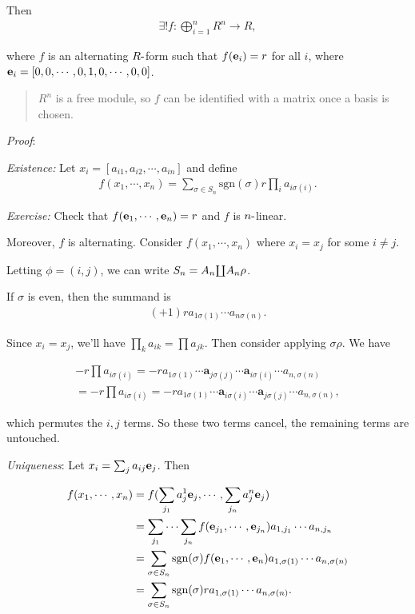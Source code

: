 Then
\begin{align*}
\exists! f: \bigoplus_{i=1}^n R^n \to R
,\end{align*}

where \(f\) is an alternating \(R{\hbox{-}}\)form such that
\(f(\mathbf{e}_i) = r\) for all \(i\), where
\(\mathbf{e}_i = [0, 0, \cdots, 0, 1, 0, \cdots, 0, 0]\).

\begin{quote}
\(R^n\) is a free module, so \(f\) can be identified with a matrix once
a basis is chosen.
\end{quote}

\emph{Proof}:

\emph{Existence:} Let \(x_i = [a_{i1}, a_{i2}, \cdots, a_{in}]\) and
define
\begin{align*}
f(x_1, \cdots, x_n) = \sum_{\sigma \in S_n} \mathrm{sgn}(\sigma) r \prod_i a_{i \sigma(i)}
.\end{align*}

\emph{Exercise:} Check that \(f(\mathbf{e}_1, \cdots, \mathbf{e}_n) = r\)
and \(f\) is \(n{\hbox{-}}\)linear.

Moreover, \(f\) is alternating. Consider \(f(x_1, \cdots, x_n)\) where
\(x_i = x_j\) for some \(i\neq j\).

Letting \(\phi = (i, j)\), we can write
\(S_n = A_n {\coprod} A_n \rho\).

If \(\sigma\) is even, then the summand is
\begin{align*}
(+1)r a_{1\sigma(1)} \cdots a_{n\sigma(n)}
.\end{align*}

Since \(x_i = x_j\), we'll have \(\prod_k a_{ik} = \prod a_{jk}\). Then
consider applying \(\sigma \rho\). We have

\begin{align*}
-r \prod a_{i\sigma(i)}
= -r a_{1\sigma(1)} \cdots \mathbf{a}_{j \sigma(j)} \cdots \mathbf{a}_{i \sigma(i)} \cdots a_{n, \sigma(n)} \\
=
-r \prod a_{i\sigma(i)}
= -r a_{1\sigma(1)} \cdots \mathbf{a}_{i \sigma(i)} \cdots \mathbf{a}_{j \sigma(j)} \cdots a_{n, \sigma(n)}
,\end{align*}

which permutes the \(i,j\) terms. So these two terms cancel, the
remaining terms are untouched.

\emph{Uniqueness}: Let \(x_i = \sum_j a_{ij} \mathbf{e}_j\). Then

\begin{align*}
f(x_1, \cdots, x_n)
&= f(\sum_{j_1} a^1_j \mathbf{e}_j, \cdots, \sum_{j_n} a^n_j \mathbf{e}_j) \\
&= \sum_{j_1} \cdots \sum_{j_n} f(\mathbf{e}_{j_1}, \cdots, \mathbf{e}_{j_n} ) a_{1, j_1} \cdots a_{n, j_n} \\
&= \sum_{\sigma \in S_n} \mathrm{sgn}(\sigma) f(\mathbf{e}_1, \cdots, \mathbf{e}_n) a_{1, \sigma(1)} \cdots a_{n, \sigma(n)} \\
&= \sum_{\sigma \in S_n} \mathrm{sgn}(\sigma) r a_{1, \sigma(1)} \cdots a_{n, \sigma(n)}
.\end{align*}

